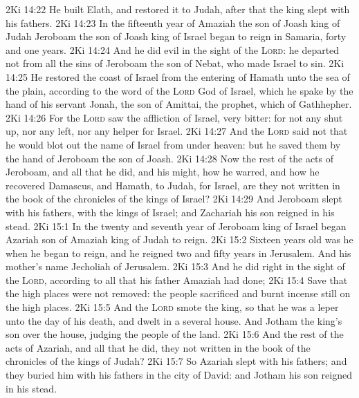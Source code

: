 \vs 2Ki 14:22 He built Elath, and restored it to Judah, after that the king slept with his fathers.
\vs 2Ki 14:23 In the fifteenth year of Amaziah the son of Joash king of Judah Jeroboam the son of Joash king of Israel began to reign in Samaria,  forty and one years.
\vs 2Ki 14:24 And he did  evil in the sight of the \textsc{Lord}: he departed not from all the sins of Jeroboam the son of Nebat, who made Israel to sin.
\vs 2Ki 14:25 He restored the coast of Israel from the entering of Hamath unto the sea of the plain, according to the word of the \textsc{Lord} God of Israel, which he spake by the hand of his servant Jonah, the son of Amittai, the prophet, which  of Gathhepher.
\vs 2Ki 14:26 For the \textsc{Lord} saw the affliction of Israel,  very bitter: for  not any shut up, nor any left, nor any helper for Israel.
\vs 2Ki 14:27 And the \textsc{Lord} said not that he would blot out the name of Israel from under heaven: but he saved them by the hand of Jeroboam the son of Joash.
\vs 2Ki 14:28 Now the rest of the acts of Jeroboam, and all that he did, and his might, how he warred, and how he recovered Damascus, and Hamath,  to Judah, for Israel, are they not written in the book of the chronicles of the kings of Israel?
\vs 2Ki 14:29 And Jeroboam slept with his fathers,  with the kings of Israel; and Zachariah his son reigned in his stead.
\vs 2Ki 15:1 In the twenty and seventh year of Jeroboam king of Israel began Azariah son of Amaziah king of Judah to reign.
\vs 2Ki 15:2 Sixteen years old was he when he began to reign, and he reigned two and fifty years in Jerusalem. And his mother's name  Jecholiah of Jerusalem.
\vs 2Ki 15:3 And he did  right in the sight of the \textsc{Lord}, according to all that his father Amaziah had done;
\vs 2Ki 15:4 Save that the high places were not removed: the people sacrificed and burnt incense still on the high places.
\vs 2Ki 15:5 And the \textsc{Lord} smote the king, so that he was a leper unto the day of his death, and dwelt in a several house. And Jotham the king's son  over the house, judging the people of the land.
\vs 2Ki 15:6 And the rest of the acts of Azariah, and all that he did,  they not written in the book of the chronicles of the kings of Judah?
\vs 2Ki 15:7 So Azariah slept with his fathers; and they buried him with his fathers in the city of David: and Jotham his son reigned in his stead.

